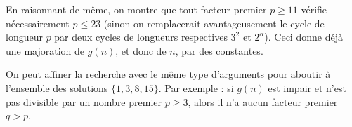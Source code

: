 En raisonnant de même, on montre que tout facteur premier $p \geq 11$ vérifie nécessairement $p \leq 23$ (sinon on remplacerait avantageusement le cycle de longueur $p$ par deux cycles de longueurs respectives $3^2$ et $2^\alpha$). Ceci donne déjà une majoration de $g(n)$, et donc de $n$, par des constantes.

On peut affiner la recherche avec le même type d'arguments pour aboutir à l'ensemble des solutions $\{1, 3,8,15\}$. Par exemple : si $g(n)$ est impair et n'est pas divisible par un nombre premier $p \geq 3$, alors il n'a aucun facteur premier $q > p$.